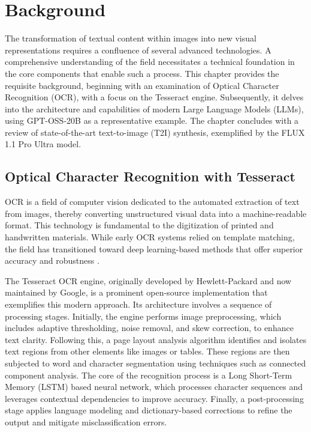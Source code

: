 \chapter{Background}
\label{chap:background}

The transformation of textual content within images into new visual representations requires a confluence of several advanced technologies. A comprehensive understanding of the field necessitates a technical foundation in the core components that enable such a process. This chapter provides the requisite background, beginning with an examination of Optical Character Recognition (OCR), with a focus on the Tesseract engine. Subsequently, it delves into the architecture and capabilities of modern Large Language Models (LLMs), using GPT-OSS-20B as a representative example. The chapter concludes with a review of state-of-the-art text-to-image (T2I) synthesis, exemplified by the FLUX 1.1 Pro Ultra model.

\section{Optical Character Recognition with Tesseract}
\label{sec:background_ocr}
OCR is a field of computer vision dedicated to the automated extraction of text from images, thereby converting unstructured visual data into a machine-readable format. This technology is fundamental to the digitization of printed and handwritten materials. While early OCR systems relied on template matching, the field has transitioned toward deep learning-based methods that offer superior accuracy and robustness \cite{esser2020improving}.

The Tesseract OCR engine, originally developed by Hewlett-Packard and now maintained by Google, is a prominent open-source implementation that exemplifies this modern approach. Its architecture involves a sequence of processing stages. Initially, the engine performs image preprocessing, which includes adaptive thresholding, noise removal, and skew correction, to enhance text clarity. Following this, a page layout analysis algorithm identifies and isolates text regions from other elements like images or tables. These regions are then subjected to word and character segmentation using techniques such as connected component analysis. The core of the recognition process is a Long Short-Term Memory (LSTM) based neural network, which processes character sequences and leverages contextual dependencies to improve accuracy. Finally, a post-processing stage applies language modeling and dictionary-based corrections to refine the output and mitigate misclassification errors.

